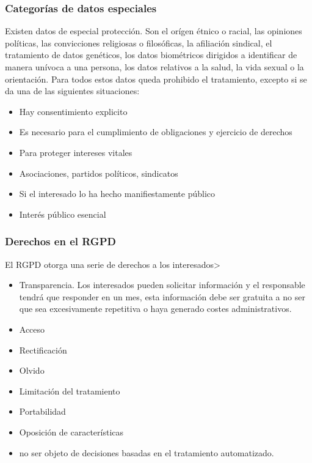     \subsubsection{Categorías de datos especiales}
        Existen datos de especial protección. Son el orígen étnico o racial, las opiniones políticas, las convicciones religiosas o filosóficas, la afiliación sindical, el tratamiento de datos genéticos, los datos biométricos dirigidos a identificar de manera unívoca a una persona, los datos relativos a la salud, la vida sexual o la orientación. Para todos estos datos queda prohibido el tratamiento, excepto si se da una de las siguientes situaciones:
        \begin{itemize}
            \item Hay consentimiento explicito
            \item Es necesario para el cumplimiento de obligaciones y ejercicio de derechos
            \item Para proteger intereses vitales
            \item Asociaciones, partidos políticos, sindicatos
            \item Si el interesado lo ha hecho manifiestamente público
            \item Interés público esencial
        \end{itemize}

    \subsubsection{Derechos en el RGPD}
        El RGPD otorga una serie de derechos a los interesados>
        \begin{itemize}
            \item Transparencia. Los interesados pueden solicitar información y el responsable tendrá que responder en un mes, esta información debe ser gratuita a no ser que sea excesivamente repetitiva o haya generado costes administrativos.
            \item Acceso
            \item Rectificación
            \item Olvido
            \item Limitación del tratamiento
            \item Portabilidad
            \item Oposición de características
            \item no ser objeto de decisiones basadas en el tratamiento automatizado.
        \end{itemize}

